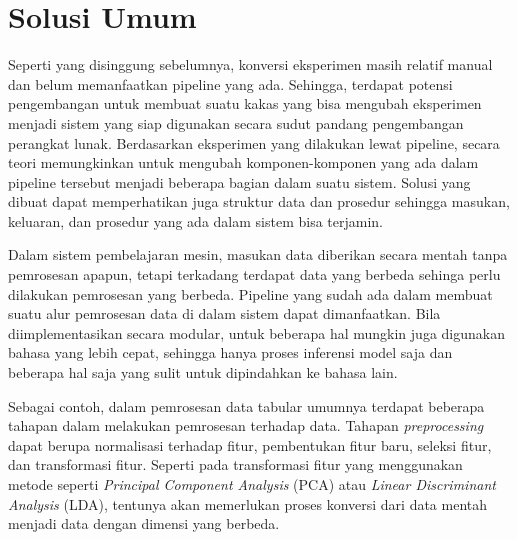 \section{Solusi Umum}

Seperti yang disinggung sebelumnya, konversi eksperimen masih relatif manual dan belum memanfaatkan pipeline yang ada.
Sehingga, terdapat potensi pengembangan untuk membuat suatu kakas yang bisa mengubah eksperimen menjadi sistem yang siap digunakan secara sudut pandang pengembangan perangkat lunak.
Berdasarkan eksperimen yang dilakukan lewat pipeline, secara teori memungkinkan untuk mengubah komponen-komponen yang ada dalam pipeline tersebut menjadi beberapa bagian dalam suatu sistem.
Solusi yang dibuat dapat memperhatikan juga struktur data dan prosedur sehingga masukan, keluaran, dan prosedur yang ada dalam sistem bisa terjamin.

Dalam sistem pembelajaran mesin, masukan data diberikan secara mentah tanpa pemrosesan apapun, tetapi terkadang terdapat data yang berbeda sehinga perlu dilakukan pemrosesan yang berbeda.
Pipeline yang sudah ada dalam membuat suatu alur pemrosesan data di dalam sistem dapat dimanfaatkan.
Bila diimplementasikan secara modular, untuk beberapa hal mungkin juga digunakan bahasa yang lebih cepat, sehingga hanya proses inferensi model saja dan beberapa hal saja yang sulit untuk dipindahkan ke bahasa lain.

Sebagai contoh, dalam pemrosesan data tabular umumnya terdapat beberapa tahapan dalam melakukan pemrosesan terhadap data.
Tahapan \textit{preprocessing} dapat berupa normalisasi terhadap fitur, pembentukan fitur baru, seleksi fitur, dan transformasi fitur.
Seperti pada transformasi fitur yang menggunakan metode seperti \textit{Principal Component Analysis} (PCA) atau \textit{Linear Discriminant Analysis} (LDA), tentunya akan memerlukan proses konversi dari data mentah menjadi data dengan dimensi yang berbeda.

